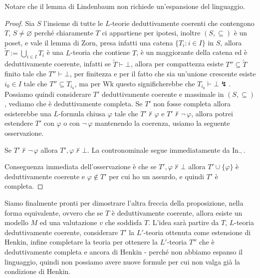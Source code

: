 \begin{remark}
    Notare che il lemma di Lindenbaum non richiede un'espansione del linguaggio.
\end{remark}

\begin{proof}
    Sia $S$ l'insieme di tutte le $L$-teorie deduttivamente coerenti che contengono $T$, $S \ne \varnothing$ perché chiaramente $T$ ci appartiene per ipotesi, inoltre $(S,\subseteq)$ è un poset,
    e vale il lemma di Zorn, presa infatti una catena $\{T_i : i \in I\}$ in $S$, allora $\widetilde{T} := \bigcup_{i \in I} T_i$ è una $L$-teoria che contiene $T$, è un maggiorante della catena ed è deduttivamente coerente,
    infatti se $\widetilde{T} \vdash \bot$, allora per compattezza esiste $T'' \subseteq \widetilde{T}$ finito tale che $T'' \vdash \bot$, per finitezza e per il fatto che sia un'unione crescente esiste $i_0 \in I$ tale che $T'' \subseteq T_{i_0}$,
    ma per Wk questo significherebbe che $T_{i_0} \vdash \bot \lightning$.\\ 
    Possiamo quindi considerare $T'$ deduttivamente coerente e massimale in $(S,\subseteq)$, vediamo che è deduttivamente completa.
    Se $T'$ non fosse completa allora esisterebbe una $L$-formula chiusa $\varphi$ tale che $T' \nvdash \varphi$ e $T' \nvdash \neg \,\varphi$, allora potrei estendere $T'$ con $\varphi$ o con $\neg \,\varphi$ mantenendo la coerenza, usiamo la seguente osservazione.
    \begin{remark}
        Se $T' \nvdash \neg \, \varphi$ allora $T',\varphi \nvdash \bot$. La contronominale segue immediatamente da In$_\neg \,$.
    \end{remark}
    Conseguenza immediata dell'osservazione è che se $T', \varphi \nvdash \bot$ allora $T' \cup \{\varphi\}$ è deduttivamente coerente e $\varphi \not \in T'$ per cui ho un assurdo, e quindi $T'$ è completa.
\end{proof}

Siamo finalmente pronti per dimostrare l'altra freccia della proposizione, nella forma equivalente, ovvero che se $T$ è deduttivamente coerente, allora esiste un modello $M$ ed una valutazione $v$ che soddisfa $T$. L'idea sarà
partire da $T$, $L$-teoria deduttivamente coerente, considerare $T'$ la $L'$-teoria ottenuta come estensione di Henkin, infine completare la teoria per ottenere la $L'$-teoria $T''$ che è deduttivamente completa e ancora di Henkin 
- perché non abbiamo espanso il linguaggio, quindi non possiamo avere nuove formule per cui non valga già la condizione di Henkin.

